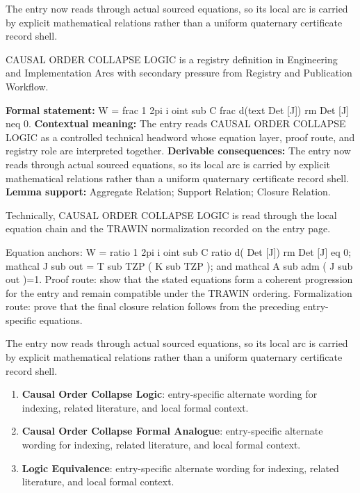 The entry now reads through actual sourced equations, so its local arc is carried by explicit mathematical relations rather than a uniform quaternary certificate record shell.
\clearpage


\begingroup\small
{}
CAUSAL ORDER COLLAPSE LOGIC is a registry definition in Engineering and Implementation Arcs with secondary pressure from Registry and Publication Workflow.

\begingroup\footnotesize\setlength{\emergencystretch}{3em}\sloppy
\textbf{Formal statement:} W = frac 1 2pi i oint sub C frac d(text Det [J]) rm Det [J] neq 0. \textbf{Contextual meaning:} The entry reads CAUSAL ORDER COLLAPSE LOGIC as a controlled technical headword whose equation layer, proof route, and registry role are interpreted together. \textbf{Derivable consequences:} The entry now reads through actual sourced equations, so its local arc is carried by explicit mathematical relations rather than a uniform quaternary certificate record shell. \textbf{Lemma support:} Aggregate Relation; Support Relation; Closure Relation.\par
\endgroup

Technically, CAUSAL ORDER COLLAPSE LOGIC is read through the local equation chain and the TRAWIN normalization recorded on the entry page.

Equation anchors: W = ratio 1 2pi i oint sub C ratio d( Det [J]) rm Det [J] eq 0; mathcal J sub out = T sub TZP ( K sub TZP ); and mathcal A sub adm ( J sub out )=1. Proof route: show that the stated equations form a coherent progression for the entry and remain compatible under the TRAWIN ordering. Formalization route: prove that the final closure relation follows from the preceding entry-specific equations.

The entry now reads through actual sourced equations, so its local arc is carried by explicit mathematical relations rather than a uniform quaternary certificate record shell.
\endgroup

\begin{enumerate}[leftmargin=1.6em,itemsep=6pt,topsep=4pt]
\item \textbf{Causal Order Collapse Logic}: entry-specific alternate wording for indexing, related literature, and local formal context.
\item \textbf{Causal Order Collapse Formal Analogue}: entry-specific alternate wording for indexing, related literature, and local formal context.
\item \textbf{Logic Equivalence}: entry-specific alternate wording for indexing, related literature, and local formal context.
\end{enumerate}

